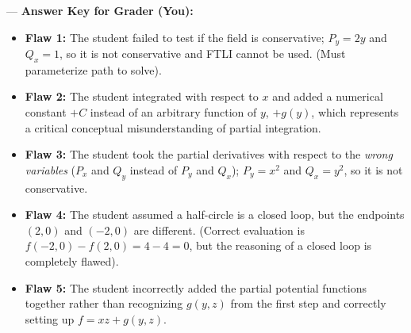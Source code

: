 \documentclass[12pt]{article}
\begin{document}
---
\vspace{1cm}
\textbf{Answer Key for Grader (You):}
\begin{itemize}
    \item \textbf{Flaw 1:} The student failed to test if the field is conservative; $P_y = 2y$ and $Q_x = 1$, so it is not conservative and FTLI cannot be used. (Must parameterize path to solve).
    \item \textbf{Flaw 2:} The student integrated with respect to $x$ and added a numerical constant $+ C$ instead of an arbitrary function of $y$, $+ g(y)$, which represents a critical conceptual misunderstanding of partial integration.
    \item \textbf{Flaw 3:} The student took the partial derivatives with respect to the \textit{wrong variables} ($P_x$ and $Q_y$ instead of $P_y$ and $Q_x$); $P_y = x^2$ and $Q_x = y^2$, so it is not conservative.
    \item \textbf{Flaw 4:} The student assumed a half-circle is a closed loop, but the endpoints $(2,0)$ and $(-2,0)$ are different. (Correct evaluation is $f(-2,0) - f(2,0) = 4 - 4 = 0$, but the reasoning of a closed loop is completely flawed).
    \item \textbf{Flaw 5:} The student incorrectly added the partial potential functions together rather than recognizing $g(y,z)$ from the first step and correctly setting up $f = xz + g(y,z)$. 
\end{itemize}
\end{document}

